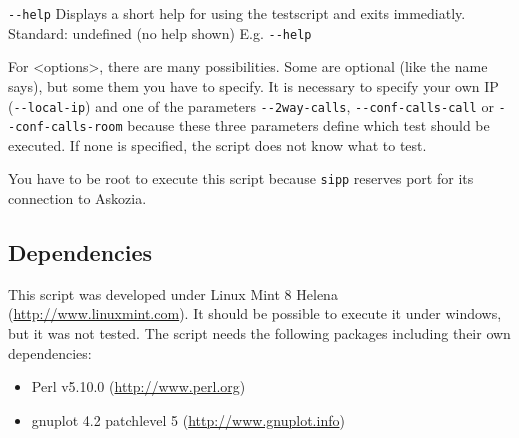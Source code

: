 \begin{description}
\item {\texttt{-{}-help}} \newline
Displays a short help for using the testscript and exits immediatly.
\newline Standard: undefined (no help shown)
\newline E.g. \texttt{-{}-help}

\end{description}

For <options>, there are many possibilities. Some are optional (like the name says), but some them you have to specify.
It is necessary to specify your own IP (\texttt{-{}-local-ip}) and one of the parameters \texttt{-{}-2way-calls},
\texttt{-{}-conf-calls-call} or \texttt{-{}-conf-calls-room} because these three parameters define which test should be
executed. If none is specified, the script does not know what to test.

You have to be root to execute this script because \texttt{sipp} reserves port for its connection to Askozia.

\subsection{Dependencies}%
This script was developed under Linux Mint 8 Helena (\url{http://www.linuxmint.com}). It should be possible to execute it under windows, but it was not tested.
The script needs the following packages including their own dependencies:
\begin{itemize}
	\item Perl v5.10.0 (\url{http://www.perl.org})
	\item gnuplot 4.2 patchlevel 5 (\url{http://www.gnuplot.info})
\end{itemize}
